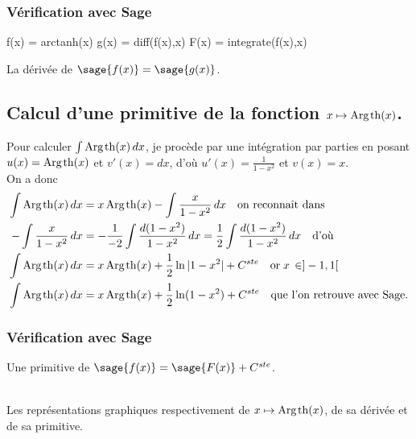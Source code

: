 \documentclass[a4paper,12pt]{report}
\renewcommand{\tanh}{\mathop{\mathrm{th}}}
\renewcommand{\arg}{\mathop{\mathrm{Arg}}}
\begin{document}
\subsubsection{Vérification avec Sage}


\begin{sageblock}
    f(x) = arctanh(x)
    g(x) = diff(f(x),x)
    F(x) = integrate(f(x),x)
\end{sageblock}

La dérivée de $\sage{f(x)} = \sage{g(x)} $.


\subsection{Calcul d'une primitive de la fonction  $x \mapsto \arg\mspace{-1mu}\tanh(x)$.}

Pour calculer $\int \arg\mspace{-1mu}\tanh(x) \, dx$, je procède par une intégration par parties en posant $u(x) = \arg\mspace{-1mu}\tanh(x)$ et $v'(x) = dx$, d'où $u'(x) = \frac{1}{ 1 - x^2 }$ et $ v(x) = x $. \\
On a donc
\begin{align*}
\int \arg\mspace{-1mu}\tanh(x) \, dx & = x \arg\mspace{-1mu}\tanh(x) - \int  \frac{x}{ 1 - x^2 } \, dx \quad \textrm{on reconnaît dans}\\
- \int  \frac{x}{ 1 - x^2 } \, dx & = -\frac{1}{-2} \int  \frac{d(1 - x^2 )}{ 1 - x^2 } \, dx = \frac{1}{2} \int  \frac{d(1 - x^2 )}{ 1 - x^2 } \, dx  \quad \textrm{d'où}\\
\int \arg\mspace{-1mu}\tanh(x) \, dx & = x \arg\mspace{-1mu}\tanh(x) + \frac{1}{2} \ln|1- x^2| + C^{ste} \quad \textrm{or} \; x \, \in ]-1, 1[ \\
\int \arg\mspace{-1mu}\tanh(x) \, dx & = x \arg\mspace{-1mu}\tanh(x) + \frac{1}{2} \ln(1- x^2) + C^{ste} \quad \textrm{que l'on retrouve avec Sage.}
\end{align*}


\subsubsection{Vérification avec Sage}

Une primitive de $\sage{f(x)} = \sage{F(x)} + C^{ste} $.

\begin{center}
\\
Les représentations graphiques respectivement de $x \mapsto \arg\mspace{-1mu}\tanh(x)$, de sa dérivée et de sa primitive.
\end{center}
\end{document}
